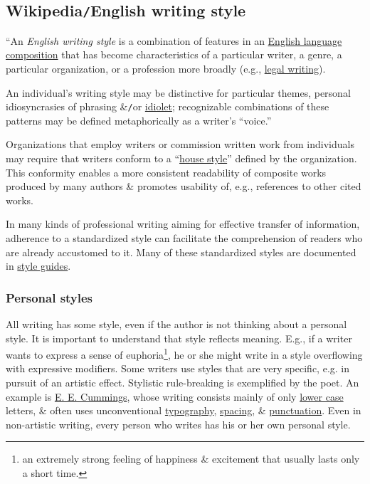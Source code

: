 \documentclass{article}
\begin{document}

\subsection{Wikipedia{\tt/}English writing style}
``An {\it English writing style} is a combination of features in an \href{https://en.wikipedia.org/wiki/English_language}{English language} \href{https://en.wikipedia.org/wiki/Writing}{composition} that has become characteristics of a particular writer, a genre, a particular organization, or a profession more broadly (e.g., \href{https://en.wikipedia.org/wiki/Legal_writing}{legal writing}).

An individual's writing style may be distinctive for particular themes, personal idiosyncrasies of phrasing \&{\tt/}or \href{https://en.wikipedia.org/wiki/Idiolect}{idiolet}; recognizable combinations of these patterns may be defined metaphorically as a writer's ``voice.''

Organizations that employ writers or commission written work from individuals may require that writers conform to a ``\href{https://en.wikipedia.org/wiki/Style_guide}{house style}'' defined by the organization. This conformity enables a more consistent readability of composite works produced by many authors \& promotes usability of, e.g., references to other cited works.

In many kinds of professional writing aiming for effective transfer of information, adherence to a standardized style can facilitate the comprehension of readers who are already accustomed to it. Many of these standardized styles are documented in \href{https://en.wikipedia.org/wiki/Style_guide}{style guides}.

\subsubsection{Personal styles}
All writing has some style, even if the author is not thinking about a personal style. It is important to understand that style reflects meaning. E.g., if a writer wants to express a sense of euphoria\footnote{an extremely strong feeling of happiness \& excitement that usually lasts only a short time.}, he or she might write in a style overflowing with expressive modifiers. Some writers use styles that are very specific, e.g. in pursuit of an artistic effect. Stylistic rule-breaking is exemplified by the poet. An example is \href{https://en.wikipedia.org/wiki/E._E._Cummings}{E. E. Cummings}, whose writing consists mainly of only \href{https://en.wikipedia.org/wiki/Lower_case}{lower case} letters, \& often uses unconventional \href{https://en.wikipedia.org/wiki/Typography}{typography}, \href{https://en.wikipedia.org/wiki/White_space_(visual_arts)}{spacing}, \& \href{https://en.wikipedia.org/wiki/Punctuation}{punctuation}. Even in non-artistic writing, every person who writes has his or her own personal style.
\end{document}
